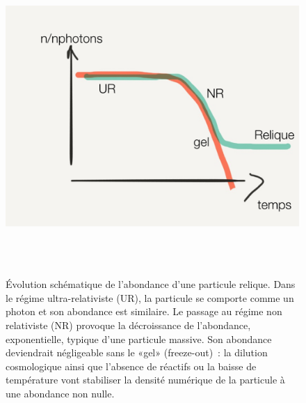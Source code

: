 \begin{figure}[htbp]
	\centering
		\includegraphics[height=12cm]{figs/freeze.png}
	\caption[Évolution schématique de l'abondance d'une particule relique.]{Évolution schématique de l'abondance d'une particule relique. Dans le régime ultra-relativiste (UR), la particule se comporte comme un photon et son abondance est similaire. Le passage au régime non relativiste (NR) provoque la décroissance de l'abondance, exponentielle, typique d'une particule massive. Son abondance deviendrait négligeable sans le «gel» (freeze-out)~: la dilution cosmologique ainsi que l'absence de réactifs ou la baisse de température vont stabiliser la densité numérique de la particule à une abondance non nulle. }
	\label{f:freeze}
\end{figure}
 
